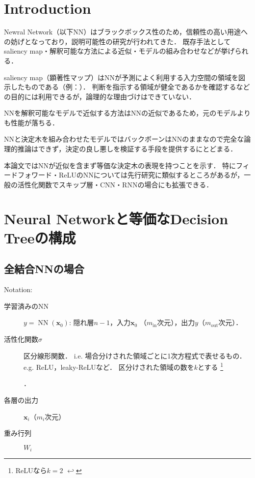 \documentclass[dvipdfmx,autodetect-engine,12pt,fleqn]{jsarticle}
\DeclareMathOperator{\NN}{NN}
\newcounter{footnote-anchor}
\newcommand{\footnoteanchor}[1]{
    \hypertarget{footnote-anchor\arabic{footnote-anchor}}{}%
    \footnote{#1 \hyperlink{footnote-anchor\arabic{footnote-anchor}}{$\hookleftarrow$}}%
    \addtocounter{footnote-anchor}{1}
}
\begin{document}
\section{Introduction}

Newral Network（以下NN）はブラックボックス性のため，信頼性の高い用途への妨げとなっており，説明可能性の研究が行われてきた．
既存手法としてsaliency map・解釈可能な方法による近似・モデルの組み合わせなどが挙げられる．

saliency map（顕著性マップ）はNNが予測によく利用する入力空間の領域を図示したものである（例：）．
判断を指示する領域が健全であるかを確認するなどの目的には利用できるが，論理的な理由づけはできていない．


NNを解釈可能なモデルで近似する方法はNNの近似であるため，元のモデルよりも性能が落ちる．

NNと決定木を組み合わせたモデルではバックボーンはNNのままなので完全な論理的推論はできず，決定の良し悪しを検証する手段を提供するにとどまる．

本論文ではNNが近似を含まず等価な決定木の表現を持つことを示す．
特にフィードフォワード・ReLUのNNについては先行研究に類似するところがあるが，一般の活性化関数でスキップ層・CNN・RNNの場合にも拡張できる．

\section{Neural Networkと等価なDecision Treeの構成}

\subsection{全結合NNの場合}

\noindent Notation:
\newcommand{\layervector}[1]{\bm{x}_{#1}}
\newcommand{\activation}[1]{\sigma\rbra{#1}}
\newcommand{\weightmatrix}[1]{W_{#1}}
\newcommand{\transpose}{\mathsf{T}}
\newcommand{\weightmatrixT}[1]{W_{#1}^\transpose}
\begin{description}
\item[学習済みのNN] $y=\NN(\layervector{0})$: 隠れ層$n-1$，入力$\layervector{0}$ （${m_{\text{in}}}$次元），出力$y$（$m_{\text{out}}$次元）．
\item[活性化関数$\sigma$] 区分線形関数．
i.e. 場合分けされた領域ごとに1次方程式で表せるもの．
e.g. ReLU，leaky-ReLUなど．
区分けされた領域の数を$k$とする\footnoteanchor{ReLUなら$k=2$}．
\item[各層の出力] $\layervector{i}$（$m_i$次元）
\item[重み行列] $W_i$
\end{description}
\end{document}
